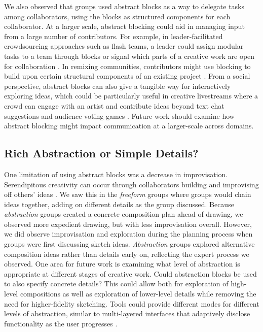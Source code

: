 We also observed that groups used abstract blocks as a way to delegate tasks among collaborators, using the blocks as structured components for each collaborator. At a larger scale, abstract blocking could aid in managing input from a large number of contributors. For example, in leader-facilitated crowdsourcing approaches such as flash teams, a leader could assign modular tasks to a team through blocks \cite{Retelny2014,Salehi2018,Valentine2017} or signal which parts of a creative work are open for collaboration \cite{kim2014ensemble}. In remixing communities, contributors might use blocking to build upon certain structural components of an existing project \cite{Resnick2009}. From a social perspective, abstract blocks can also give a tangible way for interactively exploring ideas, which could be particularly useful in creative livestreams where a crowd can engage with an artist and contribute ideas beyond text chat suggestions and audience voting games \cite{Fraser2019}. Future work should examine how abstract blocking might impact communication at a larger-scale across domains.

\subsection{Rich Abstraction or Simple Details?}
One limitation of using abstract blocks was a decrease in improvisation. Serendipitous creativity can occur through collaborators building and improvising off others' ideas \cite{Davis2017,Davis2016}. We saw this in the \textit{freeform} groups where groups would chain ideas together, adding on different details as the group discussed. Because \textit{abstraction} groups created a concrete composition plan ahead of drawing, we observed more expedient drawing, but with less improvisation overall. However, we did observe improvisation and exploration during the planning process when groups were first discussing sketch ideas. \textit{Abstraction} groups explored alternative composition ideas rather than details early on, reflecting the expert process we observed. One area for future work is examining what level of abstraction is appropriate at different stages of creative work. Could abstraction blocks be used to also specify concrete details? This could allow both for exploration of high-level compositions as well as exploration of lower-level details while removing the need for higher-fidelity sketching. Tools could provide different modes for different levels of abstraction, similar to multi-layered interfaces that adaptively disclose functionality as the user progresses \cite{shneiderman2002promoting}.

